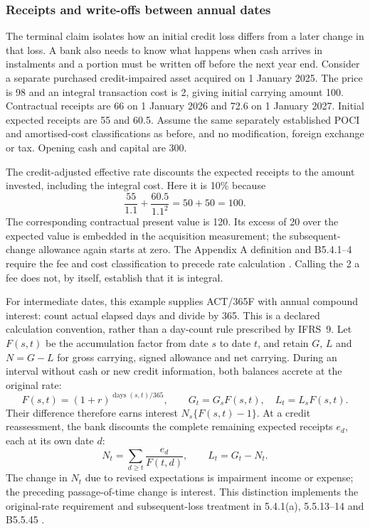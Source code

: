 \subsubsection{Receipts and write-offs between annual dates}
\label{sec:dated-credit-schedules}

The terminal claim isolates how an initial credit loss differs from a later
change in that loss. A bank also needs to know what happens when cash arrives
in instalments and a portion must be written off before the next year end.
Consider a separate purchased credit-impaired asset acquired on 1 January 2025.
The price is 98 and an integral transaction cost is 2, giving initial carrying
amount 100. Contractual receipts are 66 on 1 January 2026 and 72.6 on
1 January 2027. Initial expected receipts are 55 and 60.5. Assume the same
separately established POCI and amortised-cost classifications as before, and
no modification, foreign exchange or tax. Opening cash and capital are 300.

The credit-adjusted effective rate discounts the expected receipts to the
amount invested, including the integral cost. Here it is 10\% because
\[
 \frac{55}{1.1}+\frac{60.5}{1.1^2}=50+50=100.
\]
The corresponding contractual present value is 120. Its excess of 20 over
the expected value is embedded in the acquisition measurement; the subsequent-
change allowance again starts at zero. The Appendix A definition and
B5.4.1--4 require the fee and cost classification to precede rate calculation
\citep[IFRS~9, Appendix~A and B5.4.1--4]{eu20231803}. Calling the 2 a fee
does not, by itself, establish that it is integral.

For intermediate dates, this example supplies ACT/365F with annual compound
interest: count actual elapsed days and divide by 365. This is a declared
calculation convention, rather than a day-count rule prescribed by IFRS~9.
Let \(F(s,t)\) be the accumulation factor from date \(s\) to date \(t\),
and retain \(G\), \(L\) and \(N=G-L\) for gross carrying, signed
allowance and net carrying. During an interval without cash or new credit
information, both balances accrete at the original rate:
\[
 F(s,t)=(1+r)^{\operatorname{days}(s,t)/365},\qquad
 G_t=G_sF(s,t),\quad L_t=L_sF(s,t).
\]
Their difference therefore earns interest
\(N_s\{F(s,t)-1\}\). At a credit reassessment, the bank discounts the
complete remaining expected receipts \(e_d\), each at its own date \(d\):
\[
 N_t=\sum_{d\geq t}\frac{e_d}{F(t,d)},\qquad L_t=G_t-N_t.
\]
The change in \(N_t\) due to revised expectations is impairment income or
expense; the preceding passage-of-time change is interest. This distinction
implements the original-rate requirement and subsequent-loss treatment in
5.4.1(a), 5.5.13--14 and B5.5.45 \citep{eu20231803}.

